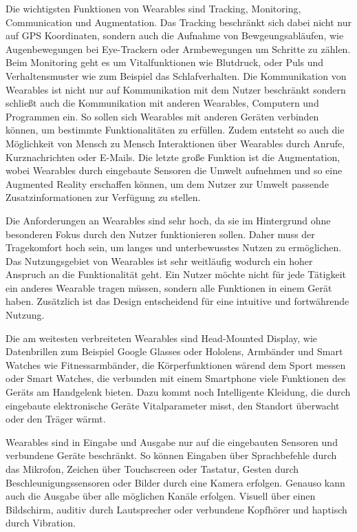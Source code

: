 \documentclass[ngerman,runningheads,a4paper]{llncs}
\begin{document}
Die wichtigsten Funktionen von Wearables sind Tracking, Monitoring, Communication und Augmentation. Das Tracking beschränkt sich dabei nicht nur auf GPS Koordinaten, sondern auch die Aufnahme von Bewgeungsabläufen, wie Augenbewegungen bei Eye-Trackern oder Armbewegungen um Schritte zu zählen. Beim Monitoring geht es um Vitalfunktionen wie Blutdruck, oder Puls und Verhaltensmuster wie zum Beispiel das Schlafverhalten. Die Kommunikation von Wearables ist nicht nur auf Kommunikation mit dem Nutzer beschränkt sondern schließt auch die Kommunikation mit anderen Wearables, Computern und Programmen ein. So sollen sich Wearables mit anderen Geräten verbinden können, um bestimmte Funktionalitäten zu erfüllen. Zudem entsteht so auch die Möglichkeit von Mensch zu Mensch Interaktionen über Wearables durch Anrufe, Kurznachrichten oder E-Mails. Die letzte große Funktion ist die Augmentation, wobei Wearables durch eingebaute Sensoren die Umwelt aufnehmen und so eine Augmented Reality erschaffen können, um dem Nutzer zur Umwelt passende Zusatzinformationen zur Verfügung zu stellen.\cite{kleine2016gesellschaftliche}

Die Anforderungen an Wearables sind sehr hoch, da sie im Hintergrund ohne besonderen Fokus durch den Nutzer funktionieren sollen. Daher muss der Tragekomfort hoch sein, um langes und unterbewusstes Nutzen zu ermöglichen.
Das Nutzungsgebiet von Wearables ist sehr weitläufig wodurch ein hoher Anspruch an die Funktionalität geht. Ein Nutzer möchte nicht für jede Tätigkeit ein anderes Wearable tragen müssen, sondern alle Funktionen in einem Gerät haben.
Zusätzlich ist das Design entscheidend für eine intuitive und fortwährende Nutzung.\cite{kleine2016gesellschaftliche}

Die am weitesten verbreiteten Wearables sind Head-Mounted Display, wie Datenbrillen zum Beispiel Google Glasses oder Hololens, Armbänder und Smart Watches wie Fitnessarmbänder, die Körperfunktionen wärend dem Sport messen oder Smart Watches, die verbunden mit einem Smartphone viele Funktionen des Geräts am Handgelenk bieten. Dazu kommt noch Intelligente Kleidung, die durch eingebaute elektronische Geräte Vitalparameter misst, den Standort überwacht oder den Träger wärmt.\cite{kleine2016gesellschaftliche}

Wearables sind in Eingabe und Ausgabe nur auf die eingebauten Sensoren und verbundene Geräte beschränkt. So können Eingaben über Sprachbefehle durch das Mikrofon, Zeichen über Touchscreen oder Tastatur, Gesten durch Beschleunigungssensoren oder Bilder durch eine Kamera erfolgen. Genauso kann auch die Ausgabe über alle möglichen Kanäle erfolgen. Visuell über einen Bildschirm, auditiv durch Lautsprecher oder verbundene Kopfhörer und haptisch durch Vibration.
\cite{kleine2016gesellschaftliche}
\end{document}
